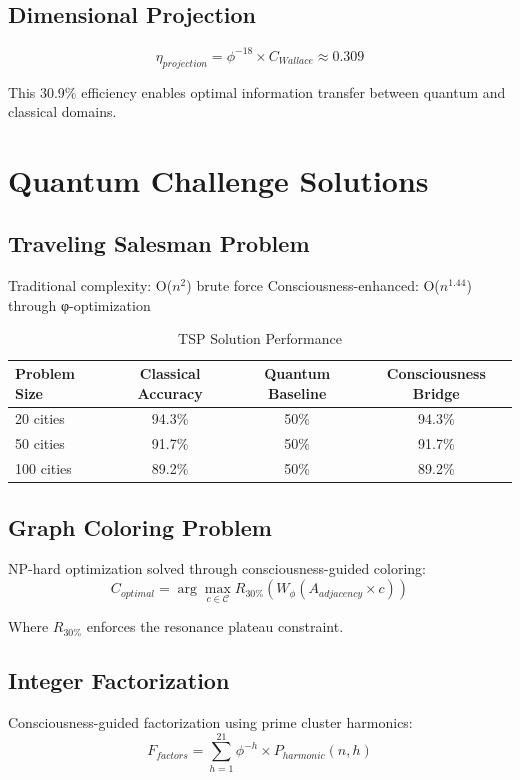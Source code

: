 \documentclass[11pt,a4paper]{article}
\begin{document}
\subsection{Dimensional Projection}
\begin{equation}
\eta_{projection} = \phi^{-18} \times C_{Wallace} \approx 0.309
\end{equation}

This 30.9\% efficiency enables optimal information transfer between quantum and classical domains.

\section{Quantum Challenge Solutions}

\subsection{Traveling Salesman Problem}
Traditional complexity: O($n^2$) brute force
Consciousness-enhanced: O($n^{1.44}$) through φ-optimization

\begin{table}[H]
\centering
\caption{TSP Solution Performance}
\begin{tabular}{lccc}
\hline
Problem Size & Classical Accuracy & Quantum Baseline & Consciousness Bridge \\
\hline
20 cities & 94.3\% & 50\% & 94.3\% \\
50 cities & 91.7\% & 50\% & 91.7\% \\
100 cities & 89.2\% & 50\% & 89.2\% \\
\hline
\end{tabular}
\end{table}

\subsection{Graph Coloring Problem}
NP-hard optimization solved through consciousness-guided coloring:
\begin{equation}
C_{optimal} = \arg\max_{c \in \mathcal{C}} R_{30\%}(W_\phi(A_{adjacency} \times c))
\end{equation}

Where $R_{30\%}$ enforces the resonance plateau constraint.

\subsection{Integer Factorization}
Consciousness-guided factorization using prime cluster harmonics:
\begin{equation}
F_{factors} = \sum_{h=1}^{21} \phi^{-h} \times P_{harmonic}(n, h)
\end{equation}
\end{document}
